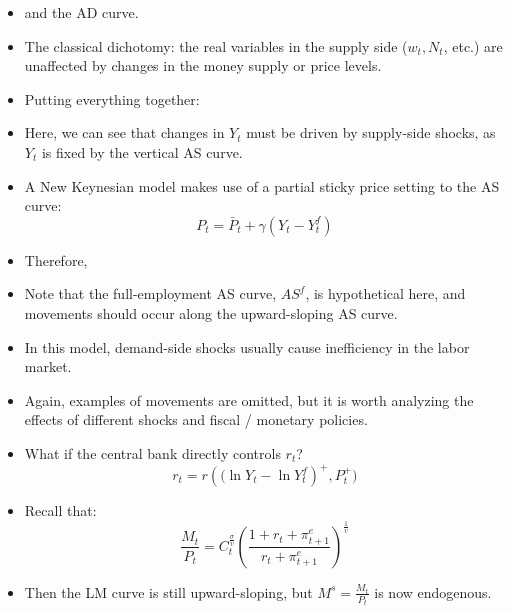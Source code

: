 \documentclass[notitlepage]{article}
\begin{document}
\begin{figure}[h]
    \centering
    \resizebox{0.8\textwidth}{!}{
    
    }
\end{figure}
\begin{itemize}
\item and the AD curve.
\end{itemize}
\begin{figure}[h]
    \centering
    \resizebox{0.4\textwidth}{!}{
    
    }
\end{figure}
\newpage
\begin{itemize}
\item The classical dichotomy: the real variables in the supply side ($w_t, N_t$, etc.) are unaffected by changes in the money supply or price levels.
\item Putting everything together:
\begin{figure}[h]
    \centering
    \resizebox{0.8\textwidth}{!}{
    
    }
\end{figure}
\item Here, we can see that changes in $Y_t$ must be driven by supply-side shocks, as $Y_t$ is fixed by the vertical AS curve.
\end{itemize}


\begin{itemize}
\item A New Keynesian model makes use of a partial sticky price setting to the AS curve:
\[
P_t = \bar{P}_t + \gamma(Y_t - Y^f_t)
\]
\item Therefore,
\end{itemize}
\newpage
\begin{figure}[h]
    \centering
    \resizebox{0.75\textwidth}{!}{
    
    }
\end{figure}

\begin{itemize}
\item Note that the full-employment AS curve, $AS^f$, is hypothetical here, and movements should occur along the upward-sloping AS curve.
\item In this model, demand-side shocks usually cause inefficiency in the labor market.
\item Again, examples of movements are omitted, but it is worth analyzing the effects of different shocks and fiscal / monetary policies.
\item What if the central bank directly controls $r_t$?
\[
r_t = r({(\ln Y_t - \ln Y_t^f})^+, P_t^+)
\]
\item Recall that:
\[
\frac{M_t}{P_t} = C_t^{\frac{\sigma}{v}}\left(\frac{1+r_t+\pi^e_{t+1}}{r_t + \pi^e_{t+1}}\right)^\frac1v
\]
\item Then the LM curve is still upward-sloping, but $M^s = \frac{M_t}{P_t}$ is now endogenous.
\end{itemize}
\end{document}
